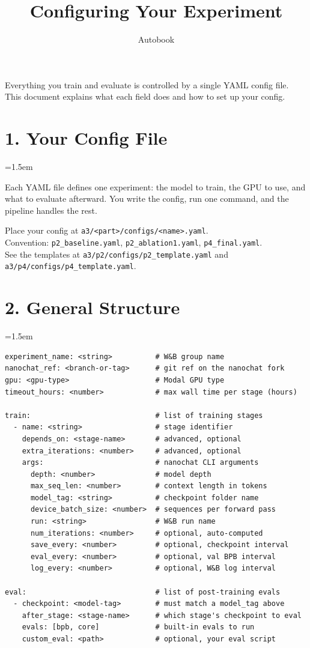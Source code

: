 \documentclass[9pt]{extarticle}
\title{\vspace{-1.2cm}\huge\textbf{Configuring Your Experiment}\vspace{-0.5em}}
\author{\normalsize Autobook}
\date{\vspace{-1.5em}}
\newcommand{\cmd}[1]{\colorbox{gray!10}{\texttt{#1}}}
\begin{document}
\maketitle
\thispagestyle{fancy}

Everything you train and evaluate is controlled by a single YAML config file. This document explains what each field does and how to set up your config.

\leftskip=0pt
\section*{1. Your Config File}
\leftskip=1.5em

Each YAML file defines one experiment: the model to train, the GPU to use, and what to evaluate afterward. You write the config, run one command, and the pipeline handles the rest.

Place your config at \cmd{a3/<part>/configs/<name>.yaml}.\\
Convention: \cmd{p2\_baseline.yaml}, \cmd{p2\_ablation1.yaml}, \cmd{p4\_final.yaml}.\\
See the templates at \cmd{a3/p2/configs/p2\_template.yaml} and \cmd{a3/p4/configs/p4\_template.yaml}.

\leftskip=0pt
\section*{2. General Structure}
\leftskip=1.5em

\begin{lstlisting}
experiment_name: <string>          # W&B group name
nanochat_ref: <branch-or-tag>      # git ref on the nanochat fork
gpu: <gpu-type>                    # Modal GPU type
timeout_hours: <number>            # max wall time per stage (hours)

train:                             # list of training stages
  - name: <string>                 # stage identifier
    depends_on: <stage-name>       # advanced, optional
    extra_iterations: <number>     # advanced, optional
    args:                          # nanochat CLI arguments
      depth: <number>              # model depth
      max_seq_len: <number>        # context length in tokens
      model_tag: <string>          # checkpoint folder name
      device_batch_size: <number>  # sequences per forward pass
      run: <string>                # W&B run name
      num_iterations: <number>     # optional, auto-computed
      save_every: <number>         # optional, checkpoint interval
      eval_every: <number>         # optional, val BPB interval
      log_every: <number>          # optional, W&B log interval

eval:                              # list of post-training evals
  - checkpoint: <model-tag>        # must match a model_tag above
    after_stage: <stage-name>      # which stage's checkpoint to eval
    evals: [bpb, core]             # built-in evals to run
    custom_eval: <path>            # optional, your eval script
\end{lstlisting}
\end{document}
